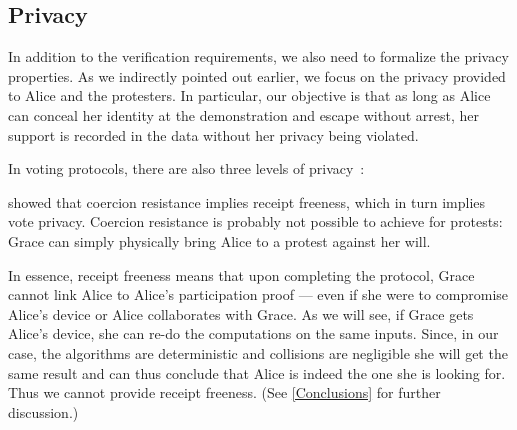 \subsection{Privacy}%
\label{Privacy}

In addition to the verification requirements, we also need to formalize the privacy properties.
As we indirectly pointed out earlier, we focus on the privacy provided to Alice and the protesters.
In particular, our objective is that as long as Alice can conceal her identity 
at the demonstration and escape without arrest, her support is recorded in the 
data without her privacy being violated.

In voting protocols, there are also three levels of privacy~\cite{VerifyingPrivacyPropertiesOfVotingProtocols}:
 showed that coercion 
resistance implies receipt freeness, which in turn implies vote privacy.
Coercion resistance is probably not possible to achieve for protests:
\eg Grace can simply physically bring Alice to a protest against her will.

In essence, receipt freeness means that upon completing the protocol, Grace 
cannot link Alice to Alice's participation proof --- even if she were to 
compromise Alice's device or Alice collaborates with Grace.
As we will see, if Grace gets Alice's device, she can re-do the computations on 
the same inputs.
Since, in our case, the algorithms are deterministic and collisions are 
negligible she will get the same result and can thus conclude that Alice is 
indeed the one she is looking for.
Thus we cannot provide receipt freeness.
(See \cref{Conclusions} for further discussion.)

